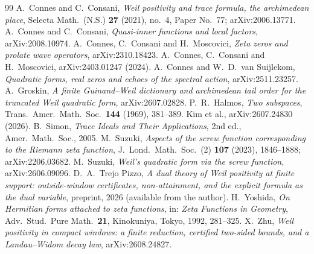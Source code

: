 \documentclass[11pt]{amsart}
\theoremstyle{definition}
\theoremstyle{remark}
\begin{document}
\begingroup\small
\begin{thebibliography}{99}
 A.~Connes and C.~Consani, \emph{Weil positivity and trace formula, the archimedean place}, Selecta Math.\ (N.S.) \textbf{27} (2021), no.~4, Paper No.~77; arXiv:2006.13771.
 A.~Connes and C.~Consani, \emph{Quasi-inner functions and local factors}, arXiv:2008.10974.
 A.~Connes, C.~Consani and H.~Moscovici, \emph{Zeta zeros and prolate wave operators}, arXiv:2310.18423.
 A.~Connes, C.~Consani and H.~Moscovici, arXiv:2403.01247 (2024).
 A.~Connes and W.~D.~van Suijlekom, \emph{Quadratic forms, real zeros and echoes of the spectral action}, arXiv:2511.23257.
 A.~Groskin, \emph{A finite Guinand--Weil dictionary and archimedean tail order for the truncated Weil quadratic form}, arXiv:2607.02828.
 P.~R.~Halmos, \emph{Two subspaces}, Trans.\ Amer.\ Math.\ Soc.\ \textbf{144} (1969), 381--389.
 Kim et al., arXiv:2607.24830 (2026).
 B.~Simon, \emph{Trace Ideals and Their Applications}, 2nd ed., Amer.\ Math.\ Soc., 2005.
 M.~Suzuki, \emph{Aspects of the screw function corresponding to the Riemann zeta function}, J.~Lond.\ Math.\ Soc.\ (2) \textbf{107} (2023), 1846--1888; arXiv:2206.03682.
 M.~Suzuki, \emph{Weil's quadratic form via the screw function}, arXiv:2606.09096.
 D.~A.~Trejo Pizzo, \emph{A dual theory of Weil positivity at finite support: outside-window certificates, non-attainment, and the explicit formula as the dual variable}, preprint, 2026 (available from the author).
 H.~Yoshida, \emph{On Hermitian forms attached to zeta functions}, in: \emph{Zeta Functions in Geometry}, Adv.\ Stud.\ Pure Math.\ \textbf{21}, Kinokuniya, Tokyo, 1992, 281--325.
 X.~Zhu, \emph{Weil positivity in compact windows: a finite reduction, certified two-sided bounds, and a Landau--Widom decay law}, arXiv:2608.24827.
\end{thebibliography}
\endgroup
\end{document}
